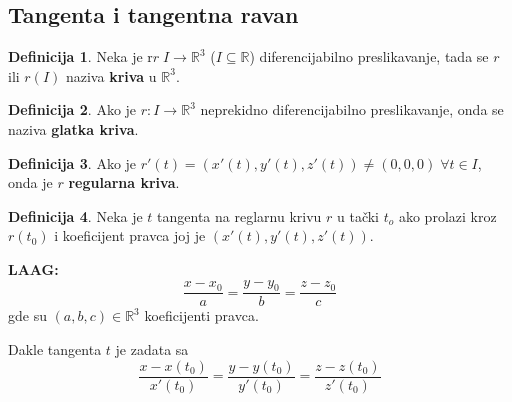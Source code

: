 \documentclass[11pt]{article}
\newcommand{\real}{\mathbb{R}}
\theoremstyle{definition}
\newtheorem{definicija}{Definicija}[section]
\theoremstyle{serbnodot}
\begin{document}
\subsection{Tangenta i tangentna ravan}

\begin{definicija}
    Neka je r\(r \; I \to \real^3\) (\(I \subseteq \real\)) diferencijabilno preslikavanje,
    tada se \(r\) ili \(r(I)\) naziva \textbf{kriva} u \(\real^3\).
\end{definicija}

\begin{definicija}
    Ako je \(r: I \to \real^3\) neprekidno diferencijabilno preslikavanje, onda se naziva
    \textbf{glatka kriva}.
\end{definicija}


\begin{definicija}
    Ako je \(r'(t) = (x'(t), y'(t), z'(t)) \neq (0, 0, 0) \; \forall t \in I\), onda je 
    \(r\) \textbf{regularna kriva}.
\end{definicija}

\begin{definicija}
    Neka je \(t\) tangenta na reglarnu krivu \(r\) u tački \(t_o\) ako prolazi kroz
    \(r(t_0)\) i koeficijent pravca joj je \((x'(t), y'(t), z'(t))\).
\end{definicija}

\textbf{LAAG:}
\[
    \frac{x-x_0}{a}= \frac{y - y_0}{b} = \frac{z - z_0}{c}
\]
gde su \((a, b, c) \in \real^3\) koeficijenti pravca.

Dakle tangenta \(t\) je zadata sa
\[
    \frac{x-x(t_0)}{x'(t_0)}= \frac{y - y(t_0)}{y'(t_0)} = \frac{z - z(t_0)}{z'(t_0)}
\]
\end{document}
